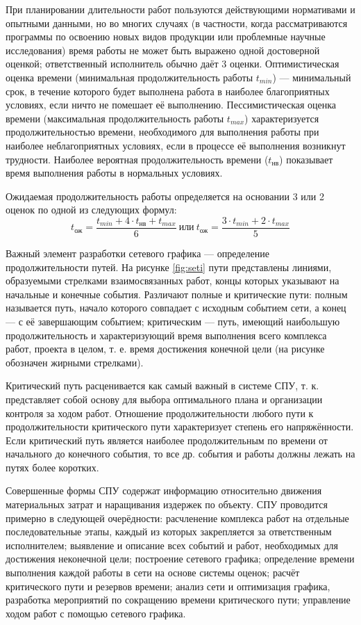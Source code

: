 При планировании длительности работ пользуются действующими нормативами и опытными данными, но во многих случаях (в частности, когда рассматриваются программы по освоению новых видов продукции или проблемные научные исследования) время работы не может быть выражено одной достоверной оценкой; ответственный исполнитель обычно даёт 3 оценки. Оптимистическая оценка времени (минимальная продолжительность работы $t_{min}$) --- минимальный срок, в течение которого будет выполнена работа в наиболее благоприятных условиях, если ничто не помешает её выполнению. Пессимистическая оценка времени (максимальная продолжительность работы $t_{max}$) характеризуется продолжительностью времени, необходимого для выполнения работы при наиболее неблагоприятных условиях, если в процессе её выполнения возникнут трудности. Наиболее вероятная продолжительность времени ($t_{\text{нв}}$) показывает время выполнения работы в нормальных условиях.

Ожидаемая продолжительность работы определяется на основании 3 или 2 оценок по одной из следующих формул:
\[t_{\text{ож}} =\dfrac{t_{min} + 4 \cdot t_{\text{нв}} + t_{max}}{6}\  \text{или} \  t_{\text{ож}} = \dfrac{3 \cdot t_{min}  +2 \cdot t_{max} }{5} \]
 

Важный элемент разработки сетевого графика --- определение продолжительности путей. На рисунке \ref{fig:seti} пути представлены линиями, образуемыми стрелками взаимосвязанных работ, концы которых указывают на начальные и конечные события. Различают полные и критические пути: полным называется путь, начало которого совпадает с исходным событием сети, а конец --- с её завершающим событием; критическим --- путь, имеющий наибольшую продолжительность и характеризующий время выполнения всего комплекса работ, проекта в целом, т. е. время достижения конечной цели (на рисунке обозначен жирными стрелками).

Критический путь расценивается как самый важный в системе СПУ, т. к. представляет собой основу для выбора оптимального плана и организации контроля за ходом работ. Отношение продолжительности любого пути к продолжительности критического пути характеризует степень его напряжённости. Если критический путь является наиболее продолжительным по времени от начального до конечного события, то все др. события и работы должны лежать на путях более коротких.

Совершенные формы СПУ содержат информацию относительно движения материальных затрат и наращивания издержек по объекту. СПУ проводится примерно в следующей очерёдности: расчленение комплекса работ на отдельные последовательные этапы, каждый из которых закрепляется за ответственным исполнителем; выявление и описание всех событий и работ, необходимых для достижения неконечной цели; построение сетевого графика; определение времени выполнения каждой работы в сети на основе системы оценок; расчёт критического пути и резервов времени; анализ сети и оптимизация графика, разработка мероприятий по сокращению времени критического пути; управление ходом работ с помощью сетевого графика.

